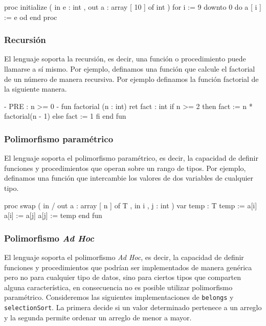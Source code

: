 \begin{pascallike}
proc initialize ( in e : int , out a : array [ 10 ] of int )
    for i := 9 downto 0 do
        a [ i ] := e
    od
end proc
\end{pascallike}

\newpage
\subsubsection{Recursión}
El lenguaje soporta la recursión, es decir, una función o procedimiento puede llamarse a sí mismo. Por ejemplo, definamos una función que calcule el factorial de un número de manera recursiva. Por ejemplo definamos la función factorial de la siguiente manera.

\begin{pascallike}
{- PRE : n >= 0 -}
fun factorial (n : int) ret fact : int
    if n >= 2 then
        fact := n * factorial(n - 1)
    else
        fact := 1
    fi
end fun
\end{pascallike}

\subsubsection{Polimorfismo paramétrico}
El lenguaje soporta el polimorfismo paramétrico, es decir, la capacidad de definir funciones y procedimientos que operan sobre un rango de tipos. Por ejemplo, definamos una función que intercambie los valores de dos variables de cualquier tipo.

\begin{pascallike}
proc swap ( in / out a : array [ n ] of T , in i , j : int )
    var temp : T
    temp := a[i]
    a[i] := a[j] 
    a[j] := temp
end fun
\end{pascallike}

\subsubsection{Polimorfismo \textit{Ad Hoc}}
El lenguaje soporta el polimorfismo \textit{Ad Hoc}, es decir, la capacidad de definir funciones y procedimientos que podrían ser implementados de manera genérica pero no para cualquier tipo de datos, sino para ciertos tipos que comparten alguna característica, en consecuencia no es posible utilizar polimorfismo paramétrico.
Consideremos las siguientes implementaciones de \texttt{belongs} y \texttt{selectionSort}. La primera decide si un valor determinado pertenece a un arreglo y la segunda permite ordenar un arreglo de menor a mayor.

